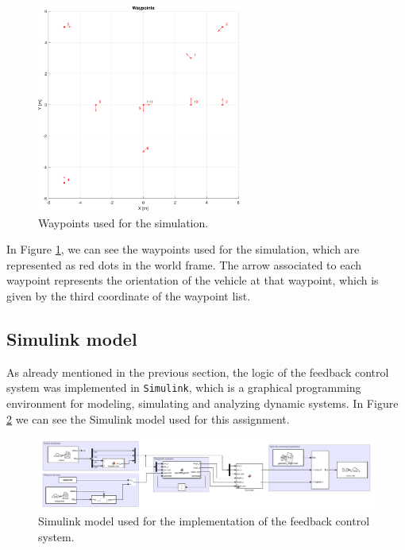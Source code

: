 \begin{figure}[H]
    \centering
    \includegraphics[width=0.6\textwidth]{./img/MATLAB/waypoints.pdf}
    \caption{Waypoints used for the simulation.}
    \label{fig:waypoints}
\end{figure}

In Figure \ref{fig:waypoints}, we can see the waypoints used for the simulation, which are represented as red dots in the world frame.
The arrow associated to each waypoint represents the orientation of the vehicle at that waypoint, which is given by the third coordinate of the waypoint list.



\subsection{Simulink model}
\label{subsec:simulink_model}

As already mentioned in the previous section, the logic of the feedback control system was implemented in \texttt{Simulink}, which is a graphical programming environment for modeling, simulating and analyzing dynamic systems.
In Figure \ref{fig:simulink_model} we can see the Simulink model used for this assignment.

\begin{figure}[H]
    \centering
    \includegraphics[width=1.0\textwidth]{./img/MATLAB/overview.pdf}
    \caption{Simulink model used for the implementation of the feedback control system.}
    \label{fig:simulink_model}
\end{figure}

